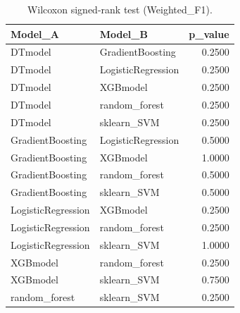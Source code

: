 \begin{table}[t]
\centering
\begin{tabular}{llr}
\toprule
Model_A & Model_B & p_value \\
\midrule
DTmodel & GradientBoosting & 0.2500 \\
DTmodel & LogisticRegression & 0.2500 \\
DTmodel & XGBmodel & 0.2500 \\
DTmodel & random_forest & 0.2500 \\
DTmodel & sklearn_SVM & 0.2500 \\
GradientBoosting & LogisticRegression & 0.5000 \\
GradientBoosting & XGBmodel & 1.0000 \\
GradientBoosting & random_forest & 0.5000 \\
GradientBoosting & sklearn_SVM & 0.5000 \\
LogisticRegression & XGBmodel & 0.2500 \\
LogisticRegression & random_forest & 0.2500 \\
LogisticRegression & sklearn_SVM & 1.0000 \\
XGBmodel & random_forest & 0.2500 \\
XGBmodel & sklearn_SVM & 0.7500 \\
random_forest & sklearn_SVM & 0.2500 \\
\bottomrule
\end{tabular}
\caption{Wilcoxon signed-rank test (Weighted_F1).}
\label{tab:wilcoxon_Weighted_F1}
\end{table}